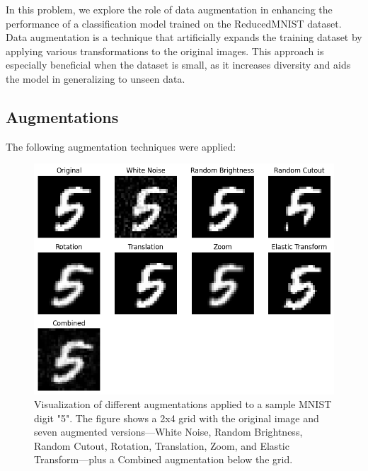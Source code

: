 \documentclass[12pt]{article}
\begin{document}
In this problem, we explore the role of data augmentation in enhancing the performance of a classification model trained on the ReducedMNIST dataset. Data augmentation is a technique that artificially expands the training dataset by applying various transformations to the original images. This approach is especially beneficial when the dataset is small, as it increases diversity and aids the model in generalizing to unseen data.

\subsection{Augmentations}
The following augmentation techniques were applied:
\begin{figure}[h]
    \centering
    \includegraphics[width=\textwidth]{Different_Augmentations.png}
    \caption{Visualization of different augmentations applied to a sample MNIST digit "5". The figure shows a 2x4 grid with the original image and seven augmented versions—White Noise, Random Brightness, Random Cutout, Rotation, Translation, Zoom, and Elastic Transform—plus a Combined augmentation below the grid.}
    \label{fig:augmentations}
\end{figure}
\end{document}
